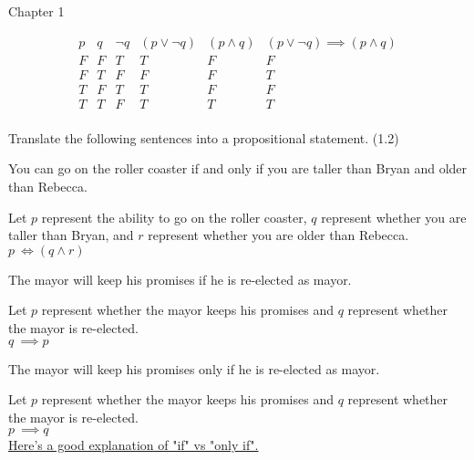 \documentclass{exam}
\begin{document}
\vspace{10pt}
{\Large Chapter 1}
\vspace{2pt}
\begin{questions}


\begin{displaymath}
\begin{array}{|c|c|c|c|c|c|}
{p} & {q} & {\neg q} & {(p \lor \neg q)} & {(p \land q)} & { (p \lor \neg q) \implies (p \land q)}
\\
\hline %
F & F & T & T & F & F\\
F & T & F & F & F & T\\
T & F & T & T & F & F\\
T & T & F & T & T & T\\
\end{array}
\end{displaymath}

\question Translate the following sentences into a propositional statement. (1.2)
\begin{subparts}

\subpart You can go on the roller coaster if and only if you are taller than Bryan and older than Rebecca.
\begin{center}
Let \(p\) represent the ability to go on the roller coaster, \(q\) represent whether you are taller than Bryan, and \(r\) represent whether you are older than Rebecca.\\
\( p \ \Longleftrightarrow (q \land r) \)
\end{center}

\subpart The mayor will keep his promises if he is re-elected as mayor.
\begin{center}
Let \(p\) represent whether the mayor keeps his promises and \(q\) represent whether the mayor is re-elected.\\
\( q \ \implies p \)
\end{center}

\subpart The mayor will keep his promises only if he is re-elected as mayor.
\begin{center}
Let \(p\) represent whether the mayor keeps his promises and \(q\) represent whether the mayor is re-elected.\\
\( p \ \implies q \)
\\ \vspace{5px} \href{https://www.khanacademy.org/test-prep/lsat/lsat-lessons/logic-toolbox-new/a/logic-toolbox--if-and-only-if}{\underline{Here's a good explanation of "if" vs "only if".}}
\end{center}


\end{subparts}
\end{questions}
\end{document}
